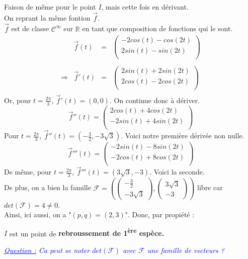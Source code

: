 Faison de même pour le point $I$, mais cette fois en dérivant.\\
On reprant la même fontion $\overrightarrow{f}$.\\
$\overrightarrow{f}$ est de classe $\mathcal{C}^\infty$ sur $\mathbb{R}$ en tant que composition de fonctions qui le sont.\\
\[
  \begin{array}{crcl}
                           & \overrightarrow{f}(t) & = &
    \left(
    \begin{array}{c}
        -2cos(t)-cos(2t) \\
        2sin(t)-sin(2t)  \\
      \end{array}
    \right)                                              \\\\
    \Rightarrow            &
    \overrightarrow{f}'(t) & =                     &
    \left(
    \begin{array}{c}
        2sin(t)+2sin(2t) \\
        2cos(t)-2cos(2t) \\
      \end{array}
    \right)                                              \\
  \end{array}
\]
Or, pour $t = \frac{2\pi}{3}$, $\overrightarrow{f}'(t)=(0, 0)$. On continue donc à dériver.
\[
  \overrightarrow{f}''(t)=
  \left(
  \begin{array}{c}
      2cos(t)+4cos(2t)  \\
      -2sin(t)+4sin(2t) \\
    \end{array}
  \right)
\]
Pour $t = \frac{2\pi}{3}$, $\overrightarrow{f}''(t)=\left(-\frac{3}{2}, -3\sqrt{3}\right)$. Voici notre première dérivée non nulle.
\[
  \overrightarrow{f}'''(t)=
  \left(
  \begin{array}{c}
      -2sin(t)-8sin(2t) \\
      -2cos(t)+8cos(2t) \\
    \end{array}
  \right)
\]
De même, pour $t = \frac{2\pi}{3}$, $\overrightarrow{f}'''(t)=\left(3\sqrt{3}, -3\right)$. Voici la seconde.
\\De plus, on a bien la famille
$\mathcal{F} = \left(
  \left(
    \begin{array}{c}
        -\frac{3}{2} \\ -3\sqrt{3}
      \end{array}
    \right),
  \left(
    \begin{array}{c}
        3\sqrt{3} \\ -3
      \end{array}
    \right)
  \right)$ libre
car $det(\mathcal{F}) = 4 \neq 0$.\\
Ainsi, ici aussi, on a "$(p, q)= (2, 3)$". Donc, par propiété :
\begin{result}
  $I$ est un point de \textbf{rebroussement de 1\textsuperscript{ère} espèce.}
\end{result}
\textcolor{Blue}{\textit{\ul{Question :} Ca peut se noter $det(\mathcal{F})$ avec $\mathcal{F}$ une famille de vecteurs ?}}


